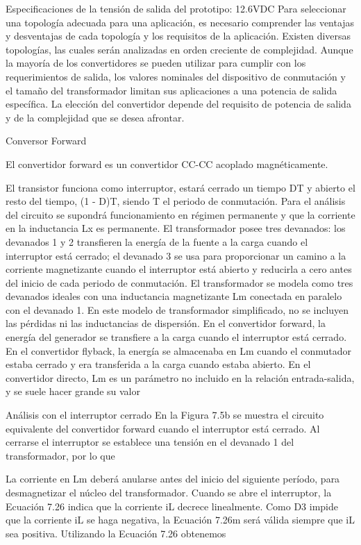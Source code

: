 Especificaciones de la tensión de salida del prototipo: 12.6VDC
Para seleccionar una topología adecuada para una aplicación, es necesario comprender las ventajas y desventajas de cada topología y los requisitos de la aplicación. 
Existen diversas topologías, las cuales serán analizadas en orden creciente de complejidad. 
Aunque la mayoría de los convertidores se pueden utilizar para cumplir con los requerimientos de salida, 
los valores nominales del dispositivo de conmutación y el tamaño del transformador limitan sus aplicaciones a una potencia de salida específica. 
La elección del convertidor depende del requisito de potencia de salida y de la complejidad que se desea afrontar.


Conversor Forward


El convertidor forward es un convertidor CC-CC acoplado magnéticamente. 

El transistor funciona como interruptor, estará cerrado un tiempo DT y abierto el resto del tiempo,
 (1 - D)T, siendo T el periodo de conmutación. 
Para el análisis del circuito se supondrá funcionamiento 
en régimen permanente y que la corriente en la inductancia Lx es permanente.
El transformador posee tres devanados: los devanados 1 y 2 transfieren la energía de la
fuente a la carga cuando el interruptor está cerrado; el devanado 3 se usa para proporcionar un
camino a la corriente magnetizante cuando el interruptor está abierto y reducirla a cero antes del
inicio de cada periodo de conmutación. El transformador se modela como tres devanados ideales
con una inductancia magnetizante Lm conectada en paralelo con el devanado 1. En este modelo
de transformador simplificado, no se incluyen las pérdidas ni las inductancias de dispersión.
En el convertidor forward, la energía del generador se transfiere a la carga cuando el interruptor
está cerrado. En el convertidor flyback, la energía se almacenaba en Lm cuando el conmutador
estaba cerrado y era transferida a la carga cuando estaba abierto. En el convertidor directo, Lm
es un parámetro no incluido en la relación entrada-salida, y se suele hacer grande su valor

Análisis con el interruptor cerrado
En la Figura 7.5b se muestra el circuito equivalente del convertidor forward cuando el interruptor
está cerrado. Al cerrarse el interruptor se establece una tensión en el devanado 1 del transformador,
por lo que

La corriente en Lm deberá anularse antes del inicio del siguiente período, para desmagnetizar
el núcleo del transformador. Cuando se abre el interruptor, la Ecuación 7.26 indica que la corriente
iL decrece linealmente. Como D3 impide que la corriente iL se haga negativa, la Ecuación
7.26m será válida siempre que iL sea positiva. Utilizando la Ecuación 7.26 obtenemos



